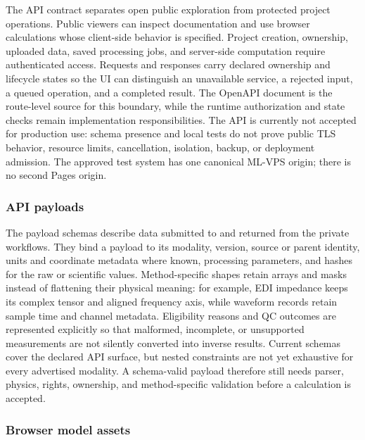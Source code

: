 The API contract separates open public exploration from protected
project operations. Public viewers can inspect documentation and use
browser calculations whose client-side behavior is specified. Project
creation, ownership, uploaded data, saved processing jobs, and
server-side computation require authenticated access. Requests and
responses carry declared ownership and lifecycle states so the UI can
distinguish an unavailable service, a rejected input, a queued operation,
and a completed result. The OpenAPI document is the route-level source
for this boundary, while the runtime authorization and state checks
remain implementation responsibilities. The API is currently not
accepted for production use: schema presence and local tests do not prove
public TLS behavior, resource limits, cancellation, isolation, backup,
or deployment admission. The approved test system has one canonical
ML-VPS origin; there is no second Pages origin.

\subsubsection{API payloads}\label{contract-api-payloads}

The payload schemas describe data submitted to and returned from the
private workflows. They bind a payload to its modality, version,
source or parent identity, units and coordinate metadata where known,
processing parameters, and hashes for the raw or scientific values.
Method-specific shapes retain arrays and masks instead of flattening
their physical meaning: for example, EDI impedance keeps its complex
tensor and aligned frequency axis, while waveform records retain sample
time and channel metadata. Eligibility reasons and QC outcomes are
represented explicitly so that malformed, incomplete, or unsupported
measurements are not silently converted into inverse results. Current
schemas cover the declared API surface, but nested constraints are not
yet exhaustive for every advertised modality. A schema-valid payload
therefore still needs parser, physics, rights, ownership, and
method-specific validation before a calculation is accepted.

\subsubsection{Browser model assets}\label{contract-browser-assets}

